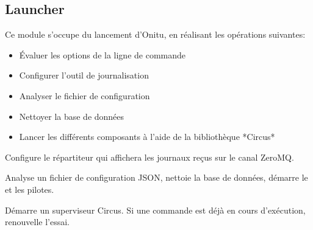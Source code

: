 \documentclass[letterpaper,10pt,english]{sphinxmanual}
\begin{document}
\subsection{Launcher}
\label{components:launcher}\label{components:module-onitu.__main__}
Ce module s'occupe du lancement d'Onitu, en réalisant les opérations suivantes:
\begin{itemize}
\item {} 
Évaluer les options de la ligne de commande

\item {} 
Configurer l'outil de journalisation

\item {} 
Analyser le fichier de configuration

\item {} 
Nettoyer la base de données

\item {} 
Lancer les différents composants à l'aide de la bibliothèque *Circus*

\end{itemize}

\begin{fulllineitems}
\label{components:onitu.__main__.get_logs_dispatcher}
Configure le répartiteur qui affichera les journaux reçus sur le canal ZeroMQ.

\end{fulllineitems}


\begin{fulllineitems}
\label{components:onitu.__main__.start_setup}
Analyse un fichier de configuration JSON, nettoie la base de données, démarre le {\hyperref[components:onitu.referee.Referee]{}} et les pilotes.

\end{fulllineitems}


\begin{fulllineitems}
\label{components:onitu.__main__.start_watcher}
Démarre un superviseur Circus. Si une commande est déjà en cours d'exécution, renouvelle l'essai.

\end{fulllineitems}
\end{document}
